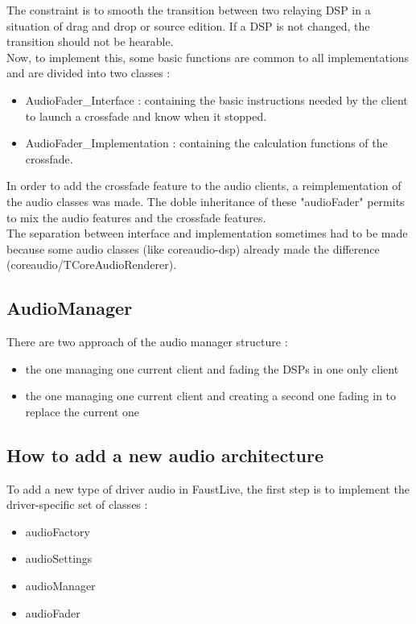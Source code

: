 \documentclass[a4paper]{article}
\begin{document}
{The constraint is to smooth the transition between two relaying DSP in a situation of drag and drop or source edition. If a DSP is not changed, the transition should not be hearable. \\
Now, to implement this, some basic functions are common to all implementations and are divided into two classes :
\begin{itemize}
\item AudioFader\_Interface : containing the basic instructions needed by the client to launch a crossfade and know when it stopped. 
\item AudioFader\_Implementation : containing the calculation functions of the crossfade.
\end{itemize}

In order to add the crossfade feature to the audio clients, a reimplementation of the audio classes was made.
The doble inheritance of these "audioFader" permits to mix the audio features and the crossfade features. \\
The separation between interface and implementation sometimes had to be made because some audio classes (like coreaudio-dsp) already made the difference (coreaudio/TCoreAudioRenderer). 

\subsection{AudioManager}

There are two approach of the audio manager structure :
\begin{itemize}
\item the one managing one current client and fading the DSPs in one only client
\item the one managing one current client and creating a second one fading in to replace the current one
\end{itemize}

\subsection{How to add a new audio architecture}

To add a new type of driver audio in FaustLive, the first step is to implement the driver-specific set of classes :
\begin{itemize}
\item audioFactory
\item audioSettings
\item audioManager
\item audioFader
\end{itemize}

}
\end{document}
